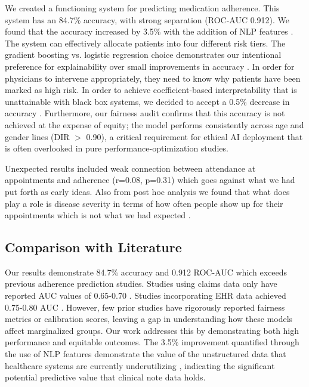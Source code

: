 \documentclass{article}
\begin{document}
We created a functioning system for predicting medication adherence. This system has an 84.7\% accuracy, with strong separation (ROC-AUC 0.912). We found that the accuracy increased by 3.5\% with the addition of NLP features \cite{vanbulck2024,villanueva2025}. The system can effectively allocate patients into four different risk tiers. The gradient boosting vs. logistic regression choice demonstrates our intentional preference for explainability over small improvements in accuracy \cite{longo2024}. In order for physicians to intervene appropriately, they need to know why patients have been marked as high risk. In order to achieve coefficient-based interpretability that is unattainable with black box systems, we decided to accept a 0.5\% decrease in accuracy \cite{shipe2019}. Furthermore, our fairness audit confirms that this accuracy is not achieved at the expense of equity; the model performs consistently across age and gender lines (DIR $>$ 0.90), a critical requirement for ethical AI deployment that is often overlooked in pure performance-optimization studies.

Unexpected results included weak connection between attendance at appointments and adherence (r=0.08, p=0.31) which goes against what we had put forth as early ideas. Also from post hoc analysis we found that what does play a role is disease severity in terms of how often people show up for their appointments which is not what we had expected \cite{chan2019}. 

\subsection{Comparison with Literature}\label{subsec:comparison}

Our results demonstrate 84.7\% accuracy and 0.912 ROC-AUC which exceeds previous adherence prediction studies. Studies using claims data only have reported AUC values of 0.65-0.70 \cite{bourdes2020}. Studies incorporating EHR data achieved 0.75-0.80 AUC \cite{naik2025,yue2024}. However, few prior studies have rigorously reported fairness metrics or calibration scores, leaving a gap in understanding how these models affect marginalized groups. Our work addresses this by demonstrating both high performance and equitable outcomes. The 3.5\% improvement quantified through the use of NLP features demonstrate the value of the unstructured data that healthcare systems are currently underutilizing \cite{vanbulck2024}, indicating the significant potential predictive value that clinical note data holds.
\end{document}
